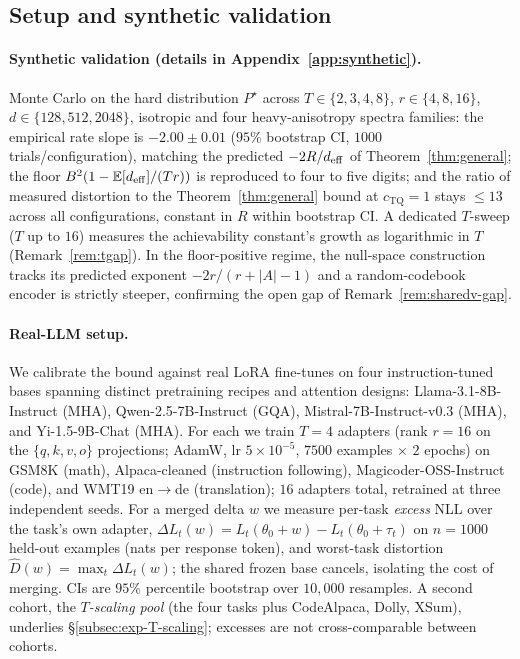 \subsection{Setup and synthetic validation}
\label{subsec:exp-setup}\label{subsec:exp-synthetic}\label{subsec:exp-T-synthetic}

\paragraph{Synthetic validation (details in
Appendix~\ref{app:synthetic}).} Monte Carlo on the hard distribution
$P^\star$ across $T\in\{2,3,4,8\}$, $r\in\{4,8,16\}$,
$d\in\{128,512,2048\}$, isotropic and four heavy-anisotropy spectra
families: the empirical rate slope is $-2.00 \pm 0.01$ ($95\%$
bootstrap CI, $1000$ trials/configuration), matching the predicted
$-2R/d_{\mathrm{eff}}$ of Theorem~\ref{thm:general}; the floor
$B^2(1 - \mathbb{E}[d_{\mathrm{eff}}]/(Tr))$ is reproduced to four to five digits; and
the ratio of measured distortion to the Theorem~\ref{thm:general}
bound at $c_{\mathrm{TQ}} = 1$ stays $\leq 13$ across all
configurations, constant in $R$ within bootstrap CI. A
dedicated $T$-sweep ($T$ up to $16$) measures the achievability
constant's growth as logarithmic in $T$ (Remark~\ref{rem:tgap}). In the
floor-positive regime, the null-space construction tracks its predicted
exponent $-2r/(r+|A|-1)$ and a random-codebook encoder is strictly
steeper, confirming the open gap of Remark~\ref{rem:sharedv-gap}.

\paragraph{Real-LLM setup.} We calibrate the bound against real LoRA
fine-tunes on four instruction-tuned bases spanning distinct
pretraining recipes and attention designs: Llama-3.1-8B-Instruct (MHA),
Qwen-2.5-7B-Instruct (GQA), Mistral-7B-Instruct-v0.3 (MHA), and
Yi-1.5-9B-Chat (MHA). For each we train $T=4$ adapters (rank $r = 16$
on the $\{q,k,v,o\}$ projections; AdamW, lr $5\times10^{-5}$, $7500$
examples $\times$ $2$ epochs) on GSM8K (math), Alpaca-cleaned
(instruction following), Magicoder-OSS-Instruct (code), and WMT19
en$\to$de (translation); $16$ adapters total, retrained at three
independent seeds. For a merged delta $w$ we measure per-task
\emph{excess} NLL over the task's own adapter,
$\Delta L_t(w) = L_t(\theta_0 + w) - L_t(\theta_0 + \tau_t)$ on
$n = 1000$ held-out examples (nats per response token), and worst-task
distortion $\widehat D(w) = \max_t \Delta L_t(w)$; the shared frozen
base cancels, isolating the cost of merging. CIs are $95\%$ percentile
bootstrap over $10{,}000$ resamples. A second cohort, the
\emph{$T$-scaling pool} (the four tasks plus CodeAlpaca, Dolly, XSum),
underlies \S\ref{subsec:exp-T-scaling}; excesses are not
cross-comparable between cohorts.

